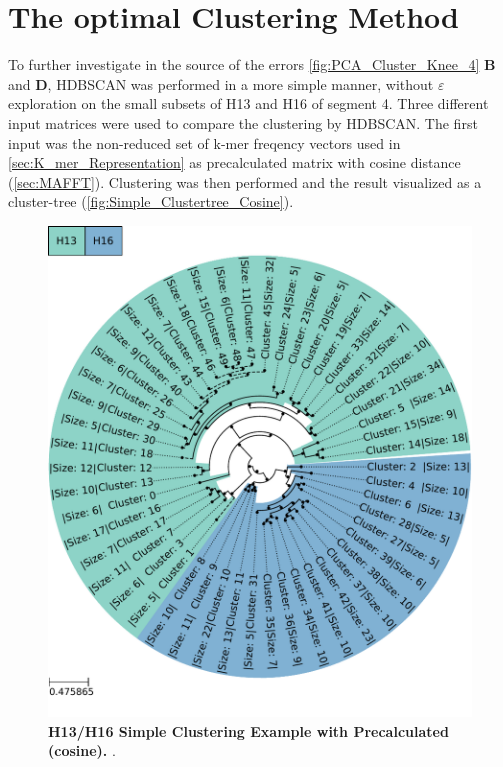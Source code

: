 \section{The optimal Clustering Method} \label{sec:Comparison_Clustering}

To further investigate in the source of the errors \autoref{fig:PCA_Cluster_Knee_4} \textbf{\textsf{B}} and \textbf{\textsf{D}}, \gls{HDBSCAN} was performed in a more simple manner, without $\varepsilon$ exploration on the small subsets of H13 and H16 of segment 4. Three different input matrices were used to compare the clustering by \gls{HDBSCAN}. The first input was the non-reduced set of k-mer freqency vectors used in \autoref{sec:K_mer_Representation} as precalculated matrix with cosine distance (\autoref{sec:MAFFT}). Clustering was then performed and the result visualized as a cluster-tree (\autoref{fig:Simple_Clustertree_Cosine}). 

\begin{figure}[!hbt]
    \centering
    \includegraphics[width=\textwidth]{PCA/Clustertree_Segment_4_H_Cosine.pdf}
    \caption[H13/H16 Simple Clustering Example with Precalculated (cosine)]{\textbf{H13/H16 Simple Clustering Example with Precalculated (cosine).} .}
    \label{fig:Simple_Clustertree_Cosine}
\end{figure}

